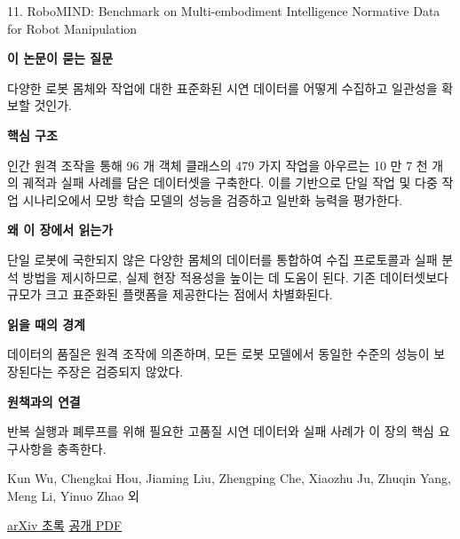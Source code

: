 \documentclass[11pt,openany]{book}
\begin{document}
\begin{termcard}{11. RoboMIND: Benchmark on Multi-embodiment Intelligence Normative Data for Robot Manipulation}

\par

\medskip

{\sffamily\bfseries\color{deepblue} 이 논문이 묻는 질문}\par

다양한 로봇 몸체와 작업에 대한 표준화된 시연 데이터를 어떻게 수집하고 일관성을 확보할 것인가.

\smallskip

{\sffamily\bfseries\color{deepblue} 핵심 구조}\par

인간 원격 조작을 통해 96 개 객체 클래스의 479 가지 작업을 아우르는 10 만 7 천 개의 궤적과 실패 사례를 담은 데이터셋을 구축한다. 이를 기반으로 단일 작업 및 다중 작업 시나리오에서 모방 학습 모델의 성능을 검증하고 일반화 능력을 평가한다.

\smallskip

{\sffamily\bfseries\color{deepblue} 왜 이 장에서 읽는가}\par

단일 로봇에 국한되지 않은 다양한 몸체의 데이터를 통합하여 수집 프로토콜과 실패 분석 방법을 제시하므로, 실제 현장 적용성을 높이는 데 도움이 된다. 기존 데이터셋보다 규모가 크고 표준화된 플랫폼을 제공한다는 점에서 차별화된다.

\smallskip

{\sffamily\bfseries\color{coral} 읽을 때의 경계}\par

데이터의 품질은 원격 조작에 의존하며, 모든 로봇 모델에서 동일한 수준의 성능이 보장된다는 주장은 검증되지 않았다.

\smallskip

{\sffamily\bfseries\color{teal} 원책과의 연결}\par

반복 실행과 폐루프를 위해 필요한 고품질 시연 데이터와 실패 사례가 이 장의 핵심 요구사항을 충족한다.

\medskip

{\footnotesize\color{muted} Kun Wu, Chengkai Hou, Jiaming Liu, Zhengping Che, Xiaozhu Ju, Zhuqin Yang, Meng Li, Yinuo Zhao 외\par

\href{https://arxiv.org/abs/2412.13877}{arXiv 초록} \quad \href{https://arxiv.org/pdf/2412.13877}{공개 PDF}\par}

\end{termcard}
\end{document}
